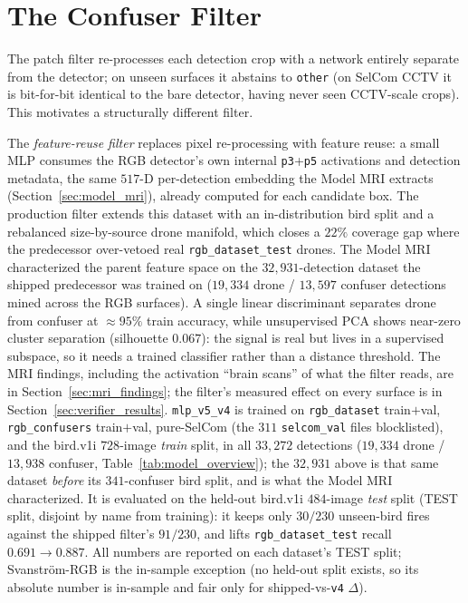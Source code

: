 \section{The Confuser Filter}
\label{sec:distill_verifier}

The patch filter re-processes each detection crop with a network entirely separate from the detector; on unseen surfaces it abstains to \texttt{other} (on SelCom CCTV it is bit-for-bit identical to the bare detector, having never seen CCTV-scale crops). This motivates a structurally different filter.

The \emph{feature-reuse filter} replaces pixel re-processing with feature reuse: a small MLP consumes the RGB detector's own internal \texttt{p3}+\texttt{p5} activations and detection metadata, the same $517$-D per-detection embedding the Model MRI extracts (Section~\ref{sec:model_mri}), already computed for each candidate box. The production filter extends this dataset with an in-distribution bird split and a rebalanced size-by-source drone manifold, which closes a $22\%$ coverage gap where the predecessor over-vetoed real \texttt{rgb\_dataset\_test} drones. The Model MRI characterized the parent feature space on the $32{,}931$-detection dataset the shipped predecessor was trained on ($19{,}334$ drone / $13{,}597$ confuser detections mined across the RGB surfaces). A single linear discriminant separates drone from confuser at ${\approx}95\%$ train accuracy, while unsupervised PCA shows near-zero cluster separation (silhouette $0.067$): the signal is real but lives in a supervised subspace, so it needs a trained classifier rather than a distance threshold. The MRI findings, including the activation ``brain scans'' of what the filter reads, are in Section~\ref{sec:mri_findings}; the filter's measured effect on every surface is in Section~\ref{sec:verifier_results}. \texttt{mlp\_v5\_v4} is trained on \texttt{rgb\_dataset} train$+$val, \texttt{rgb\_confusers} train$+$val, pure-SelCom (the $311$ \texttt{selcom\_val} files blocklisted), and the bird.v1i $728$-image \emph{train} split, in all $33{,}272$ detections ($19{,}334$ drone / $13{,}938$ confuser, Table~\ref{tab:model_overview}); the $32{,}931$ above is that same dataset \emph{before} its $341$-confuser bird split, and is what the Model MRI characterized. It is evaluated on the held-out bird.v1i $484$-image \emph{test} split (TEST split, disjoint by name from training): it keeps only $30/230$ unseen-bird fires against the shipped filter's $91/230$, and lifts \texttt{rgb\_dataset\_test} recall $0.691 \to 0.887$. All numbers are reported on each dataset's TEST split; Svanstr\"om-RGB is the in-sample exception (no held-out split exists, so its absolute number is in-sample and fair only for shipped-vs-\texttt{v4} $\Delta$).

